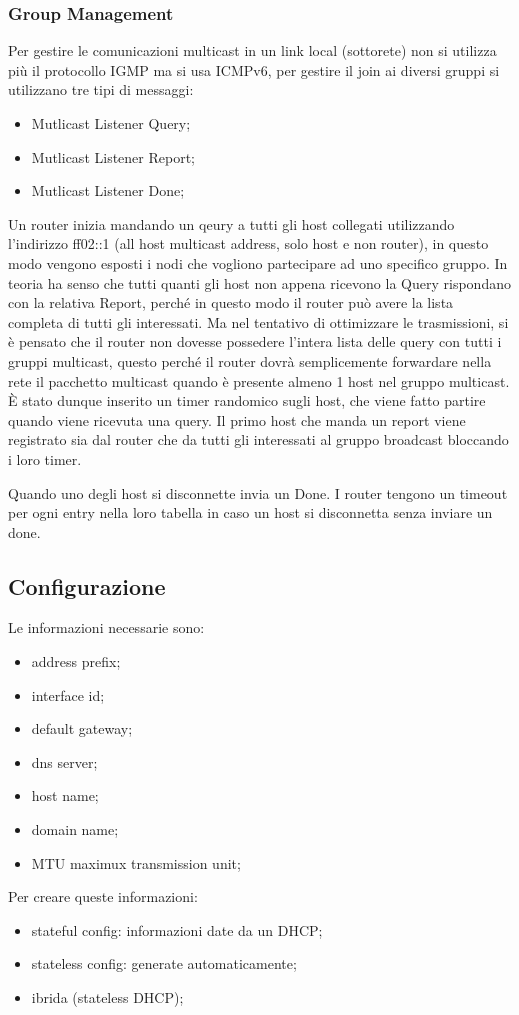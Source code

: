 \documentclass[12pt]{article}
\begin{document}
\subsubsection{Group Management}
Per gestire le comunicazioni multicast in un link local (sottorete) non si utilizza pi\`u il protocollo IGMP ma si usa ICMPv6, per gestire il join ai diversi gruppi si utilizzano tre tipi di messaggi:
\begin{itemize}
    \item Mutlicast Listener Query;
    \item Mutlicast Listener Report;
    \item Mutlicast Listener Done;
\end{itemize}
Un router inizia mandando un qeury a tutti gli host collegati utilizzando l'indirizzo ff02::1 (all host multicast address, solo host e non router), in questo modo vengono esposti i nodi che vogliono partecipare ad uno specifico gruppo. In teoria ha senso che tutti quanti gli host non appena ricevono la Query rispondano con la relativa Report, perch\'e in questo modo il router può avere la lista completa di tutti gli interessati. Ma nel tentativo di ottimizzare le trasmissioni, si \`e pensato che il router non dovesse possedere l’intera lista delle query con tutti i gruppi multicast, questo perch\'e il router dovrà semplicemente forwardare nella rete il pacchetto multicast quando è presente almeno 1 host nel gruppo multicast. \`E stato dunque inserito un timer randomico sugli host, che viene fatto partire quando viene ricevuta una query. Il primo host che manda un report viene registrato sia dal router che da tutti gli interessati al gruppo broadcast bloccando i loro timer.

Quando uno degli host si disconnette invia un Done. I router tengono un timeout per ogni entry nella loro tabella in caso un host si disconnetta senza inviare un done.




\subsection{Configurazione}
Le informazioni necessarie sono:
\begin{itemize}
    \item address prefix;
    \item interface id;
    \item default gateway;
    \item dns server;
    \item host name;
    \item domain name;
    \item MTU maximux transmission unit;
\end{itemize}
Per creare queste informazioni:
\begin{itemize}
    \item stateful config: informazioni date da un DHCP;
    \item stateless config: generate automaticamente;
    \item ibrida (stateless DHCP);
\end{itemize}
\end{document}
